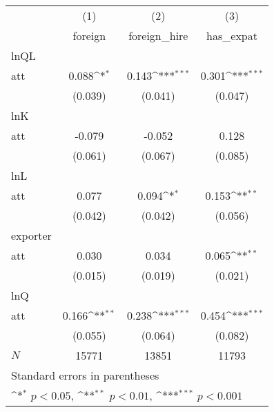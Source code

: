 {
\def\sym#1{\ifmmode^{#1}\else\(^{#1}\)\fi}
\begin{tabular}{l*{3}{c}}
\hline\hline
            &\multicolumn{1}{c}{(1)}&\multicolumn{1}{c}{(2)}&\multicolumn{1}{c}{(3)}\\
            &\multicolumn{1}{c}{ foreign}&\multicolumn{1}{c}{ foreign\_hire}&\multicolumn{1}{c}{ has\_expat}\\
\hline
lnQL        &                     &                     &                     \\
att         &       0.088\sym{*}  &       0.143\sym{***}&       0.301\sym{***}\\
            &     (0.039)         &     (0.041)         &     (0.047)         \\
\hline
lnK         &                     &                     &                     \\
att         &      -0.079         &      -0.052         &       0.128         \\
            &     (0.061)         &     (0.067)         &     (0.085)         \\
\hline
lnL         &                     &                     &                     \\
att         &       0.077         &       0.094\sym{*}  &       0.153\sym{**} \\
            &     (0.042)         &     (0.042)         &     (0.056)         \\
\hline
exporter    &                     &                     &                     \\
att         &       0.030         &       0.034         &       0.065\sym{**} \\
            &     (0.015)         &     (0.019)         &     (0.021)         \\
\hline
lnQ         &                     &                     &                     \\
att         &       0.166\sym{**} &       0.238\sym{***}&       0.454\sym{***}\\
            &     (0.055)         &     (0.064)         &     (0.082)         \\
\hline
\(N\)       &       15771         &       13851         &       11793         \\
\hline\hline
\multicolumn{4}{l}{\footnotesize Standard errors in parentheses}\\
\multicolumn{4}{l}{\footnotesize \sym{*} \(p<0.05\), \sym{**} \(p<0.01\), \sym{***} \(p<0.001\)}\\
\end{tabular}
}

